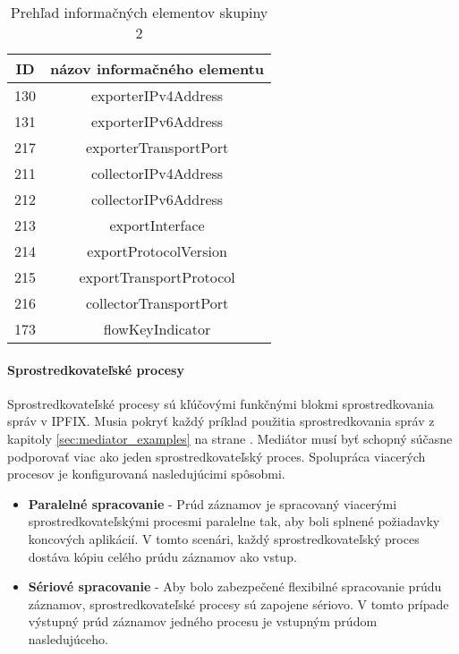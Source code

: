 \tabcolsep=8pt
\begin{table}[!ht]\caption{Prehľad informačných elementov skupiny 2}\label{t:ie-group2}
\smallskip
\centering
\begin{tabular}{|c|c|}
\hline
\textbf{ID} & \textbf{názov informačného elementu} \\ \hline
130 & exporterIPv4Address \\ \hline
131 & exporterIPv6Address \\ \hline
217 & exporterTransportPort \\ \hline
211 & collectorIPv4Address \\ \hline
212 & collectorIPv6Address \\ \hline
213 & exportInterface \\ \hline
214 & exportProtocolVersion \\ \hline
215 & exportTransportProtocol \\ \hline
216 & collectorTransportPort \\ \hline
173 & flowKeyIndicator \\ \hline
\end{tabular}
\end{table}

\paragraph{Sprostredkovateľské procesy} \label{sec:framework_intermediate}

Sprostredkovateľské procesy sú kľúčovými funkčnými blokmi sprostredkovania správ v IPFIX. Musia pokryť 
každý príklad použitia sprostredkovania správ z kapitoly \ref{sec:mediator_examples} na strane 
\pageref{sec:mediator_examples}. 
Mediátor musí byť schopný súčasne podporovať viac ako jeden sprostredkovateľský proces. Spolupráca viacerých 
procesov je konfigurovaná nasledujúcimi spôsobmi.

\begin{itemize}
 \item \textbf{Paralelné spracovanie} - Prúd záznamov je spracovaný viacerými sprostredkovateľskými procesmi 
 paralelne tak, aby boli splnené požiadavky koncových aplikácií. V tomto scenári, každý 
 sprostredkovateľský proces dostáva kópiu celého prúdu záznamov ako vstup.
 \item \textbf{Sériové spracovanie} - Aby bolo zabezpečené flexibilné spracovanie prúdu záznamov, sprostredkovateľské
 procesy sú zapojene sériovo. V tomto prípade výstupný prúd záznamov jedného procesu je vstupným prúdom 
 nasledujúceho.
\end{itemize}






















